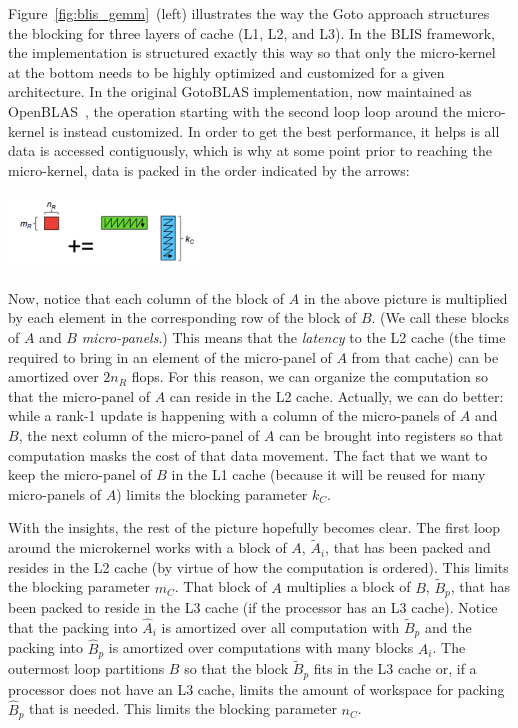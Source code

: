 Figure~\ref{fig:blis_gemm}~(left) illustrates the way the Goto approach structures the blocking for three layers of cache (L1, L2, and L3).  In the BLIS framework, the implementation is structured exactly this way so that only the micro-kernel at the bottom needs to be highly optimized and customized for a given architecture.  In the original GotoBLAS implementation, now maintained as OpenBLAS~\cite{OpenBLASweb}, the operation starting with the second loop loop around the micro-kernel is instead customized.  In order to get the best performance, it helps is all data is accessed contiguously, which is why at some point prior to reaching the micro-kernel, data is packed in the order indicated by the arrows:
\begin{center}
	\includegraphics[width=2in]{figures/microkernel.pdf}
\end{center}
Now, notice that each column of the block of $ A $ in the above picture is multiplied by each element in the corresponding row of the block of $ B $.  (We call these blocks of $ A $ and $ B $ {\em micro-panels}.)  This means that the {\em latency} to the L2 cache (the time required to bring in an element of the micro-panel of $ A $ from that cache) can be amortized over $ 2n_R $ flops.  For this reason, we can organize the computation so that the micro-panel of $ A $ can reside in the L2 cache.  Actually, we can do better: while a rank-1 update is happening with a column of the micro-panels of $ A $ and $ B $, the next column of the micro-panel of $ A $ can be brought into registers so that computation masks the cost of that data movement.
The fact that we want to keep the micro-panel of $ B $ in the L1 cache (because it will be reused for many micro-panels of $ A $) limits the blocking parameter $ k_C $.

With the insights, the rest of the picture hopefully becomes clear.
The first loop around the microkernel works with a block of $ A $, $ \widetilde A_i $, that has been packed and resides in the L2 cache (by virtue of how the computation is ordered).  This limits the blocking parameter $ m_C $.  That block of $ A $ multiplies a block of $ B $, $ \widetilde B_p $, that has been packed to reside in the L3 cache (if the processor has an L3 cache).  Notice that the packing into  $ \widehat A_i $ is amortized over all computation  with $ \widetilde B_p $ and the packing into $ \widehat B_p $ is amortized over computations with many blocks $ A_i $.  The outermost loop partitions $ B $ so that the block $ \widetilde B_p $ fits in the L3 cache or, if a processor does not have an L3 cache, limits the amount of workspace for packing $ \widehat B_p $ that is needed.  This limits the blocking parameter $ n_C $.

